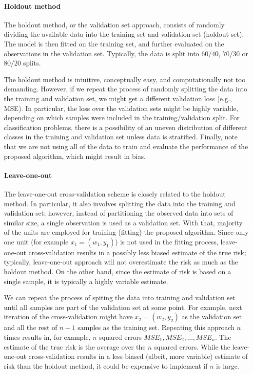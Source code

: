 \documentclass[12pt, krantz2,]{krantz}
\let\oldparagraph\paragraph
\renewcommand{\paragraph}[1]{\oldparagraph{#1}\mbox{}}
\theoremstyle{definition}
\theoremstyle{definition}
\theoremstyle{definition}
\newcommand{\1}{\mathbbm{1}}
\begin{document}
\hypertarget{holdout-method}{%
\paragraph{Holdout method}\label{holdout-method}}

The holdout method, or the validation set approach, consists of randomly
dividing the available data into the training set and validation set (holdout
set). The model is then fitted on the training set, and further evaluated on
the observations in the validation set. Typically, the data is split into
\(60/40\), \(70/30\) or \(80/20\) splits.

The holdout method is intuitive, conceptually easy, and computationally not too
demanding. However, if we repeat the process of randomly splitting the data into
the training and validation set, we might get a different validation loss (e.g.,
MSE). In particular, the loss over the validation sets might be highly
variable, depending on which samples were included in the training/validation
split. For classification problems, there is a possibility of an uneven
distribution of different classes in the training and validation set unless data
is stratified. Finally, note that we are not using all of the data to train and
evaluate the performance of the proposed algorithm, which might result in bias.

\hypertarget{leave-one-out}{%
\paragraph{Leave-one-out}\label{leave-one-out}}

The leave-one-out cross-validation scheme is closely related to the holdout
method. In particular, it also involves splitting the data into the training and
validation set; however, instead of partitioning the observed data into sets of
similar size, a single observation is used as a validation set. With that,
majority of the units are employed for training (fitting) the proposed
algorithm. Since only one unit (for example \(x_1 = (w_1, y_1)\)) is not used in
the fitting process, leave-one-out cross-validation results in a possibly less
biased estimate of the true risk; typically, leave-one-out approach will not
overestimate the risk as much as the holdout method. On the other hand, since
the estimate of risk is based on a single sample, it is typically a highly
variable estimate.

We can repeat the process of spiting the data into training and validation set
until all samples are part of the validation set at some point. For example,
next iteration of the cross-validation might have \(x_2 = (w_2,y_2)\) as the
validation set and all the rest of \(n-1\) samples as the training set. Repeating
this approach \(n\) times results in, for example, \(n\) squared errors \(MSE_1, MSE_2, \ldots, MSE_n\). The estimate of the true risk is the average over the
\(n\) squared errors. While the leave-one-out cross-validation results in a less
biased (albeit, more variable) estimate of risk than the holdout method, it
could be expensive to implement if \(n\) is large.
\end{document}
